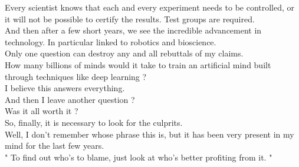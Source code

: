 \documentclass{book}
\begin{document}
Every scientist knows that each and every experiment needs to be controlled, or it will not be possible to certify the results. Test groups are required. \\

And then after a few short years, we see the incredible advancement in technology. In particular linked to robotics and bioscience. \\

Only one question can destroy any and all rebuttals of my claims. \\

How many billions of minds would it take to train an artificial mind built through techniques like deep learning ? \\

I believe this answers everything. \\

And then I leave another question ? \\

Was it all worth it ? \\

So, finally, it is necessary to look for the culprits.\\ 


Well, I don't remember whose phrase this is, but it has been very present in my mind for the last few years. \\


\center " To find out who's to blame, just look at who's better profiting from it. "
\end{document}
